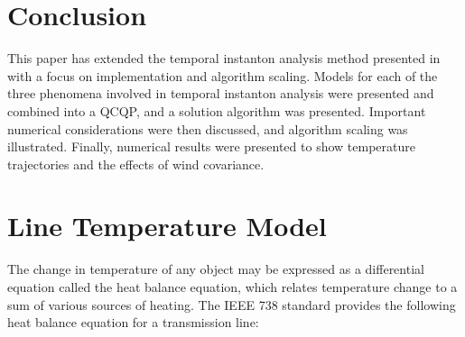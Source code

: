 \documentclass[journal,twoside]{IEEEtran}
\begin{document}
\section{Conclusion}\label{sec:conclusion}
This paper has extended the temporal instanton analysis method presented in \cite{kersulis2015} with a focus on implementation and algorithm scaling. Models for each of the three phenomena involved in temporal instanton analysis were presented
and combined into a QCQP, and a solution algorithm was presented. Important numerical considerations were then discussed, and algorithm scaling was illustrated. Finally, numerical results were presented to show temperature trajectories and the effects of wind covariance.


\appendices
\section{Line Temperature Model}\label{sec:temp}

The change in temperature of any object may be expressed as a differential equation called the heat balance equation, which relates temperature change to a sum of various sources of heating. The IEEE 738 standard \cite{ieee2013} provides the following heat balance equation for a transmission line:
\end{document}
